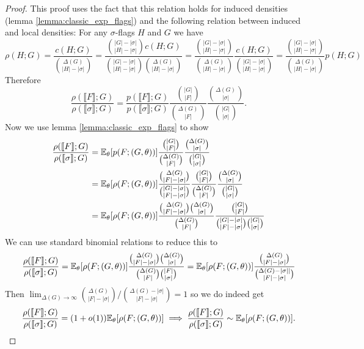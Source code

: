 \begin{proof}
    This proof uses the fact that this relation holds for induced densities
    (lemma \ref{lemma:classic_exp_flags}) and the following relation between
    induced and local densities:
    For any $\sigma$-flags $H$ and $G$ we have
    \[
        \rho(H; G)
        = \frac{c(H; G)}{\binom{\Delta(G)}{|H|-|\sigma|}}
        = \frac{\binom{|G|-|\sigma|}{|H|-|\sigma|}c(H;
        G)}{\binom{|G|-|\sigma|}{|H|-|\sigma|}\binom{\Delta(G)}{|H|-|\sigma|}}
        =
        \frac{\binom{|G|-|\sigma|}{|H|-|\sigma|}}{\binom{\Delta(G)}{|H|-|\sigma|}}\frac{c(H;G)}{\binom{|G|-|\sigma|}{|H|-|\sigma|}}
        = \frac{\binom{|G|-|\sigma|}{|H|-|\sigma|}}{\binom{\Delta(G)}{|H|-|\sigma|}}p(H;G)
    \]
    Therefore
    \[
        \frac{\rho(\llbracket F\rrbracket; G)}
        {\rho(\llbracket \sigma\rrbracket; G)}
        =
        \frac{p(\llbracket F\rrbracket; G)}
        {p(\llbracket \sigma\rrbracket; G)}
        \frac{\binom{|G|}{|F|}}{\binom{\Delta(G)}{|F|}}
        \frac{\binom{\Delta(G)}{|\sigma|}}{\binom{|G|}{|\sigma|}}.
    \]
    Now we use lemma \ref{lemma:classic_exp_flags} to show
    \[
        \begin{split}
            \frac{\rho(\llbracket F\rrbracket; G)}
            {\rho(\llbracket \sigma\rrbracket; G)}
            &= \mathbb{E}_\theta[p(F; (G,\theta))]
            \frac{\binom{|G|}{|F|}}{\binom{\Delta(G)}{|F|}}
            \frac{\binom{\Delta(G)}{|\sigma|}}{\binom{|G|}{|\sigma|}}\\
            &= \mathbb{E}_\theta[\rho(F; (G,\theta))]
            \frac{\binom{\Delta(G)}{|F|-|\sigma|}}{\binom{|G|-|\sigma|}{|F|-|\sigma|}}
            \frac{\binom{|G|}{|F|}}{\binom{\Delta(G)}{|F|}}
            \frac{\binom{\Delta(G)}{|\sigma|}}{\binom{|G|}{|\sigma|}}\\
            &= \mathbb{E}_\theta[\rho(F; (G,\theta))]
            \frac{\binom{\Delta(G)}{|F|-|\sigma|}\binom{\Delta(G)}{|\sigma|}}
            {\binom{\Delta(G)}{|F|}}
            \frac{\binom{|G|}{|F|}}
            {\binom{|G|-|\sigma|}{|F|-|\sigma|}\binom{|G|}{|\sigma|}}
        \end{split}
    \]
    We can use standard binomial relations to reduce this to
    \[
        \frac{\rho(\llbracket F\rrbracket; G)}
        {\rho(\llbracket \sigma\rrbracket; G)}
        = \mathbb{E}_\theta[\rho(F; (G,\theta))]
        \frac{\binom{\Delta(G)}{|F|-|\sigma|}\binom{\Delta(G)}{|\sigma|}}
        {\binom{\Delta(G)}{|F|}\binom{|F|}{|\sigma|}}
        = \mathbb{E}_\theta[\rho(F; (G,\theta))]
        \frac{\binom{\Delta(G)}{|F|-|\sigma|}}
        {\binom{\Delta(G)-|\sigma||}{|F|-|\sigma|}}
    \]
    Then
    $\lim_{\Delta(G)\to\infty}\binom{\Delta(G)}{|F|-|\sigma|}/\binom{\Delta(G)-|\sigma|}{|F|-|\sigma|}
    = 1$ so we do indeed get
    \[
        \frac{\rho(\llbracket F\rrbracket; G)}
        {\rho(\llbracket \sigma\rrbracket; G)}
        = (1+o(1)) \mathbb{E}_\theta[\rho(F; (G,\theta))]
        \implies
        \frac{\rho(\llbracket F\rrbracket; G)}
        {\rho(\llbracket \sigma\rrbracket; G)}
        \sim \mathbb{E}_\theta[\rho(F; (G,\theta))].
    \]
\end{proof}

